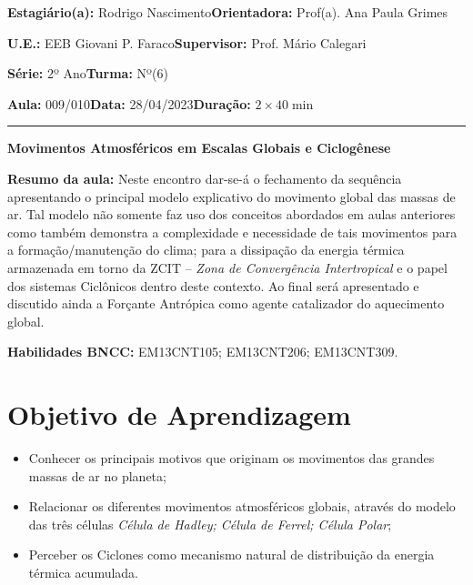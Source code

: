 \par\noindent\textbf{Estagiário(a):} Rodrigo Nascimento\hfill{}\textbf{Orientadora:} Prof(a). Ana Paula Grimes
\par\noindent\textbf{U.E.:} EEB Giovani P. Faraco\hfill{}\textbf{Supervisor:} Prof. Mário Calegari
\par\noindent\textbf{Série:} 2º Ano\hfill{}\textbf{Turma:} Nº(6)
\par\noindent\textbf{Aula:} 009/010\hfill{}\textbf{Data:} 28/04/2023\hfill{}\textbf{Duração:} $2\times 40\min$
\rule{\textwidth}{.5pt}
\bigskip{}  
\noindent
\begin{center}
	\textbf{Movimentos Atmosféricos em Escalas Globais e Ciclogênese}
\end{center}
\par\noindent\textbf{Resumo da aula:} Neste encontro dar-se-á o fechamento da sequência apresentando o principal modelo explicativo do movimento global das massas de ar. Tal modelo não somente faz uso dos conceitos abordados em aulas anteriores como também demonstra a complexidade e necessidade de tais movimentos para a formação/manutenção do clima; para a dissipação da energia térmica armazenada em torno da ZCIT -- \textit{Zona de Convergência Intertropical} e o papel dos sistemas Ciclônicos dentro deste contexto. Ao final será apresentado e discutido ainda a Forçante Antrópica como agente catalizador do aquecimento global.
\par\noindent\textbf{Habilidades BNCC:} EM13CNT105; EM13CNT206; EM13CNT309.

\section*{Objetivo de Aprendizagem}
\begin{itemize}
	\item Conhecer os principais motivos que originam os movimentos das grandes massas de ar no planeta; 
	\item Relacionar os diferentes movimentos atmosféricos globais, através do modelo das três células \textit{Célula de Hadley; Célula de Ferrel; Célula Polar};
	\item Perceber os Ciclones como mecanismo natural de distribuição da energia térmica acumulada.
\end{itemize}

\medskip{}

